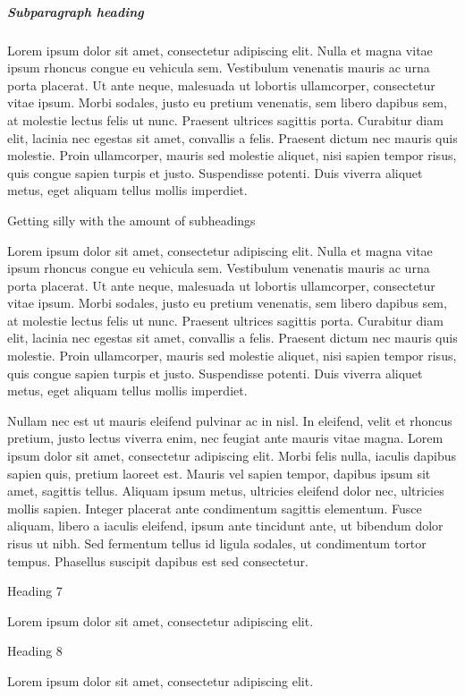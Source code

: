 \documentclass[\pandocDocMode,longtable,noextraspace,floatsintext]{apa6}
\begin{document}
\hypertarget{subparagraph-heading}{%
\subparagraph{Subparagraph heading}\label{subparagraph-heading}}

Lorem ipsum dolor sit amet, consectetur adipiscing elit. Nulla et magna
vitae ipsum rhoncus congue eu vehicula sem. Vestibulum venenatis mauris
ac urna porta placerat. Ut ante neque, malesuada ut lobortis
ullamcorper, consectetur vitae ipsum. Morbi sodales, justo eu pretium
venenatis, sem libero dapibus sem, at molestie lectus felis ut nunc.
Praesent ultrices sagittis porta. Curabitur diam elit, lacinia nec
egestas sit amet, convallis a felis. Praesent dictum nec mauris quis
molestie. Proin ullamcorper, mauris sed molestie aliquet, nisi sapien
tempor risus, quis congue sapien turpis et justo. Suspendisse potenti.
Duis viverra aliquet metus, eget aliquam tellus mollis imperdiet.

Getting silly with the amount of subheadings

Lorem ipsum dolor sit amet, consectetur adipiscing elit. Nulla et magna
vitae ipsum rhoncus congue eu vehicula sem. Vestibulum venenatis mauris
ac urna porta placerat. Ut ante neque, malesuada ut lobortis
ullamcorper, consectetur vitae ipsum. Morbi sodales, justo eu pretium
venenatis, sem libero dapibus sem, at molestie lectus felis ut nunc.
Praesent ultrices sagittis porta. Curabitur diam elit, lacinia nec
egestas sit amet, convallis a felis. Praesent dictum nec mauris quis
molestie. Proin ullamcorper, mauris sed molestie aliquet, nisi sapien
tempor risus, quis congue sapien turpis et justo. Suspendisse potenti.
Duis viverra aliquet metus, eget aliquam tellus mollis imperdiet.

Nullam nec est ut mauris eleifend pulvinar ac in nisl. In eleifend,
velit et rhoncus pretium, justo lectus viverra enim, nec feugiat ante
mauris vitae magna. Lorem ipsum dolor sit amet, consectetur adipiscing
elit. Morbi felis nulla, iaculis dapibus sapien quis, pretium laoreet
est. Mauris vel sapien tempor, dapibus ipsum sit amet, sagittis tellus.
Aliquam ipsum metus, ultricies eleifend dolor nec, ultricies mollis
sapien. Integer placerat ante condimentum sagittis elementum. Fusce
aliquam, libero a iaculis eleifend, ipsum ante tincidunt ante, ut
bibendum dolor risus ut nibh. Sed fermentum tellus id ligula sodales, ut
condimentum tortor tempus. Phasellus suscipit dapibus est sed
consectetur.

Heading 7

Lorem ipsum dolor sit amet, consectetur adipiscing elit.

Heading 8

Lorem ipsum dolor sit amet, consectetur adipiscing elit.

\newpage

\noindent \vspace{-2em} \setlength{\parindent}{-0.5in}
\setlength{\leftskip}{0.5in} \setlength{\parskip}{15pt}

\printbibliography[title=References]
\end{document}
